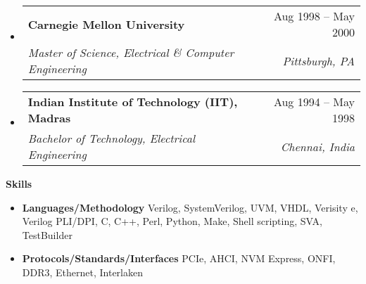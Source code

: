 \documentclass[letterpaper,12pt]{article}[leftmargin=*]
\makeatletter
\def \entryspacing {-0pt}
\renewcommand{\section}[2]{\vspace{5pt}
  \colorbox{secondary}{\color{white}\raggedbottom\normalsize\textbf{{#1}{\hspace{7pt}#2}}}
}
\newcommand{\resumeEntryStart}{\begin{itemize}[leftmargin=2.5mm]}
\newcommand{\resumeEntryEnd}{\end{itemize}\vspace{\entryspacing}}
\newcommand{\resumeEntryTSDL}[4]{
  \vspace{-1pt}\item[]
  \begin{tabularx}{0.97\textwidth}{X@{\hspace{60pt}}r}
    \textbf{\color{primary}#1} & {\firabook\color{accent}\small#2} \\
    \textit{\color{accent}\small#3} & \textit{\color{accent}\small#4} \\
  \end{tabularx}\vspace{-6pt}
}
\newcommand{\resumeEntryS}[2]{
\item[]\small{
  \textbf{\color{primary}#1 }{ #2 \vspace{-6pt}}
}
}
\makeatother
\begin{document}
\resumeEntryStart
\resumeEntryTSDL
    {Carnegie Mellon University}{Aug 1998 -- May 2000}
    {Master of Science, Electrical \& Computer Engineering}{Pittsburgh, PA}
 \resumeEntryEnd    

\resumeEntryStart
\resumeEntryTSDL
    {Indian Institute of Technology (IIT), Madras}{Aug 1994 -- May 1998}
    {Bachelor of Technology, Electrical Engineering}{Chennai, India}
\resumeEntryEnd    

\section{\faGears}{Skills}

\resumeEntryStart
\resumeEntryS{Languages/Methodology } {Verilog, SystemVerilog, UVM, VHDL, Verisity e, Verilog PLI/DPI, C, C++, Perl, Python, Make, Shell scripting, SVA, TestBuilder}
\resumeEntryS{Protocols/Standards/Interfaces } {PCIe, AHCI, NVM Express, ONFI, DDR3, Ethernet, Interlaken}
\resumeEntryEnd
\end{document}
